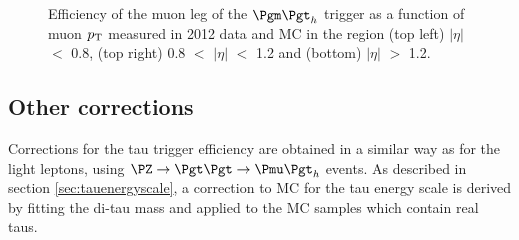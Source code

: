 \begin{figure}[htb]

\begin{center}
\end{center}
\caption{Efficiency of the muon leg of the $\mutau$ trigger as a function of muon $p_{\mathrm{T}}$ measured in
2012 data and MC in the region (top left) $|\eta|$ $<$ 0.8, (top right) 0.8
$<$ $|\eta|$ $<$ 1.2 and (bottom) $|\eta|$ $>$ 1.2.}
\label{fig:muontrg}
\end{figure}

\subsection{Other corrections}
\label{sec:othercorrections}

Corrections for the tau trigger efficiency are obtained in a similar way as for the
light leptons, using $\PZ\to\Pgt\Pgt\to\Pmu\Pgt_{h}$ events. As described in
section \ref{sec:tauenergyscale}, a correction to \ac{MC} for the tau energy
scale is derived by fitting the di-tau mass and applied to the \ac{MC} samples
which contain real taus. 

